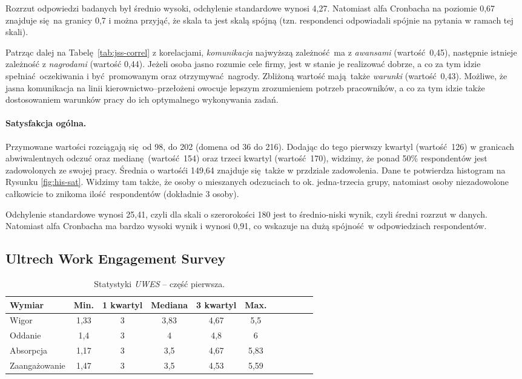 Rozrzut odpowiedzi badanych był średnio wysoki, odchylenie standardowe wynosi 4,27. Natomiast alfa Cronbacha na poziomie 0,67 znajduje się na granicy 0,7 i można przyjąć, że skala ta jest skalą spójną (tzn. respondenci odpowiadali spójnie na pytania w ramach tej skali).

Patrząc dalej na Tabelę \ref{tab:jss-correl} z korelacjami, \textit{komunikacja} najwyższą zależność ma z \textit{awansami} (wartość 0,45), następnie istnieje zależność z \textit{nagrodami} (wartość 0,44). Jeżeli osoba jasno rozumie cele firmy, jest w stanie je realizować dobrze, a co za tym idzie spełniać oczekiwania i być promowanym oraz otrzymywać nagrody. Zbliżoną wartość mają także \textit{warunki} (wartość 0,43). Możliwe, że jasna komunikacja na linii
kierownictwo--przełożeni owocuje lepszym zrozumieniem potrzeb pracowników, a co za tym idzie także dostosowaniem warunków pracy do ich optymalnego wykonywania zadań.

\paragraph{Satysfakcja ogólna.}
Przymowane wartości rozciągają się od 98, do 202 (domena od 36 do 216). Dodając do tego pierwszy kwartyl (wartość 126) w granicach abwiwalentnych odczuć oraz medianę (wartość 154) oraz trzeci kwartyl (wartość 170), widzimy, że ponad 50\% respondentów jest zadowolonych ze swojej pracy. Średnia o wartośći 149,64 znajduje się także w przdziale zadowolenia. Dane te potwierdza histogram na Rysunku \ref{fig:his-sat}. Widzimy tam także, że osoby o mieszanych odczuciach to ok.
jedna-trzecia grupy, natomiast osoby niezadowolone całkowicie to znikoma ilość respondentów (dokładnie 3 osoby).

Odchylenie standardowe wynosi 25,41, czyli dla skali o szerorokości 180 jest to średnio-niski wynik, czyli średni rozrzut w danych. Natomiast alfa Cronbacha ma bardzo wysoki wynik i wynosi 0,91, co wskazuje na dużą spójność w odpowiedziach respondentów.

\FloatBarrier

\subsection{Ultrech Work Engagement Survey}

\begin{table}[h!]
\begin{center}
\begin{tabular}{l | c c c c c c c c c c}
Wymiar & Min. & 1 kwartyl & Mediana & 3 kwartyl & Max.\\ \hline \hline
Wigor & 1,33 & 3 & 3,83 & 4,67 & 5,5 \\
Oddanie & 1,4 & 3 & 4 & 4,8 & 6 \\
Absorpcja & 1,17 & 3 & 3,5 & 4,67 & 5,83 \\ \hline
Zaangażowanie & 1,47 & 3 & 3,5 & 4,53 & 5,59 \\
\end{tabular}
\end{center}
\caption{Statystyki \emph{UWES} -- część pierwsza.}
\label{tab:uwes-stats-1}
\end{table}

